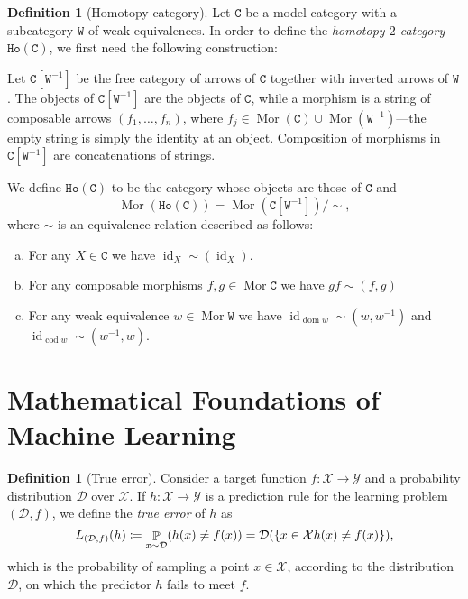 \documentclass[11pt, reqno]{amsart}
\theoremstyle{definition}
\newtheorem{definition}[theorem]{Definition}
\let\colon\relax
\newcommand{\cat}{\texttt}
\newcommand{\catfont}{\texttt}
\DeclareMathOperator{\Mor}{Mor}   %
\DeclareMathOperator{\Id}{id}     %
\DeclareMathOperator{\dom}{dom}   %
\DeclareMathOperator{\codom}{cod} %
\newcommand{\Ho}[1]{{\catfont{Ho}(#1)}}            %
\DeclareMathOperator{\Prob}{\mathbb{P}} %
\begin{document}
\begin{definition}[Homotopy category]
\label{def:homotopy-category}
Let \(\cat C\) be a model category with a subcategory \(\cat W\) of weak
equivalences. In order to define the \emph{homotopy \(2\)-category}
\(\Ho{\cat C}\), we first need the following construction:

Let \(\cat C[\cat W^{-1}]\) be the free category of arrows of \(\cat C\)
together with inverted arrows of \(\cat W\). The objects of
\(\cat C[\cat W^{-1}]\) are the objects of \(\cat C\), while a morphism is a
string of composable arrows \((f_1, \dots, f_n)\), where
\(f_j \in \Mor(\cat C) \cup \Mor(\cat W^{-1})\)---the empty string is simply the
identity at an object. Composition of morphisms in \(\cat C[\cat W^{-1}]\) are
concatenations of strings.

We define \(\Ho{\cat C}\) to be the category whose objects are those of \(\cat
C\) and
\[
\Mor(\Ho{\cat C}) = \Mor(\cat C[\cat W^{-1}])/{\sim},
\]
where \(\sim\) is an equivalence relation described as follows:
\begin{enumerate}[(a)]\setlength\itemsep{0em}
\item For any \(X \in \cat C\) we have \(\Id_X \sim (\Id_X)\).

\item For any composable morphisms \(f, g \in \Mor \cat C\) we have \(g f \sim (f, g)\)

\item For any weak equivalence \(w \in \Mor \cat W\) we have \(\Id_{\dom w} \sim (w,
  w^{-1})\) and \(\Id_{\codom w} \sim (w^{-1}, w)\).
\end{enumerate}
\end{definition}


\section{Mathematical Foundations of Machine Learning}

\begin{definition}[True error]
\label{def:true-error}
Consider a target function \(f: \mathcal{X} \to \mathcal{Y}\) and a probability
distribution \(\mathcal{D}\) over \(\mathcal{X}\). If
\(h: \mathcal{X} \to \mathcal{Y}\) is a prediction rule for the learning problem
\((\mathcal{D}, f)\), we define the \emph{true error} of \(h\) as
\[
L_{(\mathcal{D}, f)}(h)
\coloneq \Prob_{x \sim \mathcal{D}}(h(x) \neq f(x))
= \mathcal{D}(\{x \in \mathcal{X} \colon h(x) \neq f(x)\}),
\]
which is the probability of sampling a point \(x \in \mathcal{X}\), according to
the distribution \(\mathcal{D}\), on which the predictor \(h\) fails to meet \(f\).
\end{definition}
\end{document}
